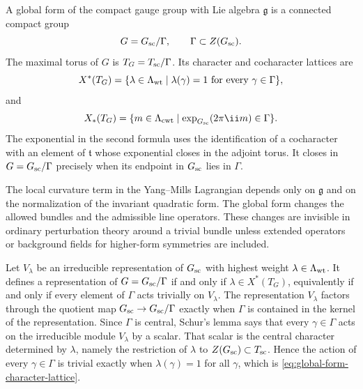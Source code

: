 \begin{definition}
\label{def:compact-global-form}
A global form of the compact gauge group with Lie algebra \(\mathfrak g\) is
a connected compact group
\[
  G=G_{\rm sc}/\Gamma,
  \qquad
  \Gamma\subset Z(G_{\rm sc}).
\]
The maximal torus of \(G\) is \(T_G=T_{\rm sc}/\Gamma\).  Its character and
cocharacter lattices are
\begin{equation}
  X^*(T_G)
  =
  \{\lambda\in\Lambda_{\rm wt}\mid \lambda(\gamma)=1
  \text{ for every }\gamma\in\Gamma\},
  \label{eq:global-form-character-lattice}
\end{equation}
and
\begin{equation}
  X_*(T_G)
  =
  \{m\in\Lambda_{\rm cwt}\mid
  \exp_{G_{\rm sc}}(2\pi\ii m)\in\Gamma\}.
  \label{eq:global-form-cocharacter-lattice}
\end{equation}
The exponential in the second formula uses the identification of a
cocharacter with an element of \(\mathfrak t\) whose exponential closes in
the adjoint torus.  It closes in \(G=G_{\rm sc}/\Gamma\) precisely when its
endpoint in \(G_{\rm sc}\) lies in \(\Gamma\).
\end{definition}

The local curvature term in the Yang--Mills Lagrangian depends only on
\(\mathfrak g\) and on the normalization of the invariant quadratic form.
The global form changes the allowed bundles and the admissible line
operators.  These changes are invisible in ordinary perturbation theory
around a trivial bundle unless extended operators or background fields for
higher-form symmetries are included.

Let \(V_\lambda\) be an irreducible representation of \(G_{\rm sc}\) with
highest weight \(\lambda\in\Lambda_{\rm wt}\).  It defines a representation
of \(G=G_{\rm sc}/\Gamma\) if and only if
\(\lambda\in X^*(T_G)\), equivalently if and only if every element of
\(\Gamma\) acts trivially on \(V_\lambda\).
The representation \(V_\lambda\) factors through the quotient map
\(G_{\rm sc}\to G_{\rm sc}/\Gamma\) exactly when \(\Gamma\) is contained in
the kernel of the representation.  Since \(\Gamma\) is central, Schur's
lemma says that every \(\gamma\in\Gamma\) acts on the irreducible module
\(V_\lambda\) by a scalar.  That scalar is the central character determined
by \(\lambda\), namely the restriction of \(\lambda\) to
\(Z(G_{\rm sc})\subset T_{\rm sc}\).  Hence the action of every
\(\gamma\in\Gamma\) is trivial exactly when
\(\lambda(\gamma)=1\) for all \(\gamma\), which is
\eqref{eq:global-form-character-lattice}.

